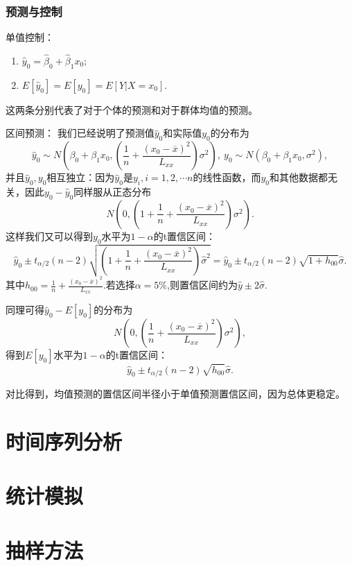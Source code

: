 \documentclass[lang=cn,10pt]{elegantbook}
\begin{document}
    \subsection{预测与控制}
    单值控制：
    \begin{enumerate}
        \item \(\hat{y}_0=\hat{\beta}_0+\hat{\beta}_1x_0;\)
        \item \(E[\hat{y}_0]=E[y_0]=E[Y|X=x_0].\)
    \end{enumerate}
    这两条分别代表了对于个体的预测和对于群体均值的预测。

    区间预测：
    我们已经说明了预测值\(\hat{y}_0\)和实际值\(y_0\)的分布为
    \[\hat{y}_0\sim N(\beta_0+\beta_1x_0,(\frac{1}{n}+\frac{(x_0-\overline{x})^2}{L_{xx}})\sigma^2),\ y_0\sim N(\beta_0+\beta_1x_0,\sigma^2),\]
    并且\(\hat{y}_0,y_0\)相互独立：因为\(\hat{y}_0\)是\(y_i,i=1,2,\cdots n\)的线性函数，而\(y_0\)和其他数据都无关，因此\(y_0-\hat{y}_0\)同样服从正态分布
    \[N(0,(1+\frac{1}{n}+\frac{(x_0-\overline{x})^2}{L_{xx}})\sigma^2).\]
    这样我们又可以得到\(y_0\)水平为\(1-\alpha\)的t置信区间：
    \[\hat{y}_0\pm t_{\alpha/2}(n-2)\sqrt{(1+\frac{1}{n}+\frac{(x_0-\overline{x})^2}{L_{xx}})\hat{\sigma}^2}=\hat{y}_0\pm t_{\alpha/2}(n-2)\sqrt{1+h_{00}}\hat{\sigma}.\]
    其中\(h_{00}=\frac{1}{n}+\frac{(x_0-\overline{x})^2}{L_{xx}}.\)若选择\(\alpha=5\%\),则置信区间约为\(\hat{y}\pm 2\hat{\sigma}\).

    同理可得\(\hat{y}_0-E[y_0]\)的分布为
    \[N(0,(\frac{1}{n}+\frac{(x_0-\overline{x})^2}{L_{xx}})\sigma^2),\]
    得到\(E[y_0]\)水平为\(1-\alpha\)的t置信区间：
    \[\hat{y}_0\pm t_{\alpha/2}(n-2)\sqrt{h_{00}}\hat{\sigma}.\]
    \begin{note}
        对比得到，均值预测的置信区间半径小于单值预测置信区间，因为总体更稳定。
    \end{note}



    \chapter{时间序列分析}

    \chapter{统计模拟}

    \chapter{抽样方法}
\end{document}
